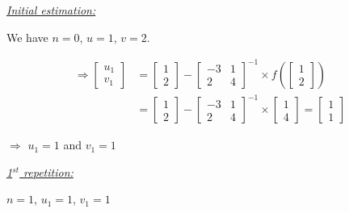 \documentclass[a4paper,11pt]{article}
\begin{document}
\underline{\textit{Initial estimation:}}

We have $n=0$, $u=1$, $v=2$.

\[ \begin{array}{ll}
    \Rightarrow  \begin{bmatrix} u_{1} \\ v_{1} \end{bmatrix} &= \begin{bmatrix} 1 \\ 2  \end{bmatrix} - \begin{bmatrix} -3 & 1  \\ 2 & 4  \end{bmatrix}^{-1} \times f\left(\begin{bmatrix} 1 \\ 2 \end{bmatrix}\right) \\
    &= \begin{bmatrix} 1 \\ 2  \end{bmatrix} - \begin{bmatrix} -3 & 1  \\ 2 & 4  \end{bmatrix}^{-1} \times \begin{bmatrix} 1 \\ 4 \end{bmatrix} = \begin{bmatrix} 1 \\ 1 \end{bmatrix} 
\end{array} \]

$\Rightarrow$ $u_1 = 1$  and $v_1 = 1$

\underline{\textit{1$^{st}$ repetition:}}

$n = 1$, $u_1 = 1$, $v_1 = 1$
\end{document}
